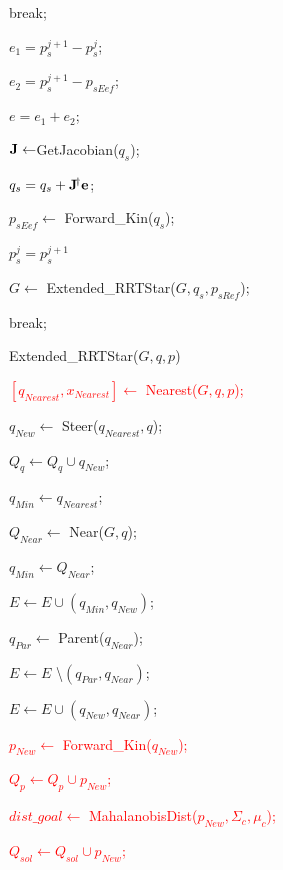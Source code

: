 \documentclass[letterpaper, 10 pt, conference]{ieeeconf}  %
\newcommand{\psin}{{\!\dagger}}
\begin{document}
\begin{algorithm}[H]
{{{				break;
			}
			
			$e_1=p_s^{j+1} - p_s^{j}$;
			
			$e_2=p_s^{j+1} - p_{sEef}$;
			
			$e=e_1+e_2$;
			
			\BlankLine
			$\bf{J}\leftarrow$GetJacobian($q_s$);
			
			$q_s=q_s+ \bf{J}^{\psin} e$;
			
			$p_{sEef}\leftarrow $ Forward\_Kin($q_s$);
			
			\BlankLine
			$p_s^{j} = p_s^{j+1}$
			\BlankLine
			
			{
				$G \leftarrow $ Extended\_RRTStar($G,q_s,p_{sRef}$);
				
				break;
			}
		}
	}
\end{algorithm}

\begin{algorithm}[H]
 \caption{Extended\_RRTStar($G,q,p$)}\label{Extended_RRTStar}


\setcounter{AlgoLine}{0}

\BlankLine

\textcolor{red} {$[q_{Nearest},x_{Nearest}] \leftarrow$ Nearest($G,q,p$);}

$q_{New} \leftarrow$ Steer($q_{Nearest},q$);

{
	$Q_q \leftarrow Q_q \cup  q_{New} $;
	
	$q_{Min} \leftarrow  q_{Nearest}$;
	
	$Q_{Near} \leftarrow$ Near($G,q$);
	
	{
		{
			{
				$q_{Min} \leftarrow Q_{Near}$;
			}
			
		}
	}
	
	$E \leftarrow E \cup (q_{Min},q_{New})$;
	
	{
		{
			$q_{Par} \leftarrow$ Parent($q_{Near}$); 
			
			$E \leftarrow E$ \textbackslash $(q_{Par},q_{Near})$;
			
			$E \leftarrow E \cup (q_{New},q_{Near})$;
		}
	}
    

\BlankLine
	\textcolor{red} {$p_{New}\leftarrow$ Forward\_Kin($q_{New}$);}
	
	\textcolor{red} {	$Q_p \leftarrow Q_p \cup  p_{New} $;}
	
	\textcolor{red}{ $dist\_goal \leftarrow$ MahalanobisDist($p_{New},\Sigma_{c},\mu_{c}$);}
	 
	\textcolor{red} {
	{
		$Q_{sol} \leftarrow Q_{sol} \cup {p_{New}}$;
	}
	}
}
\end{algorithm}
\end{document}
